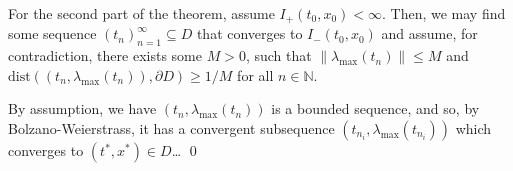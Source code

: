 \documentclass[
]{article}
\theoremstyle{definition}
\theoremstyle{definition}
\begin{document}
For the second part of the theorem, assume \(I_+(t_0, x_0) < \infty\).
Then, we may find some sequence \((t_n)_{n = 1}^\infty\subseteq D\) that
converges to \(I_-(t_0, x_0)\) and assume, for contradiction, there
exists some \(M > 0\), such that \(\|\lambda_{\max}(t_n)\| \le M\) and
\(\text{dist}((t_n, \lambda_{\max}(t_n)),  \partial D) \ge 1 / M\) for
all \(n \in \mathbb{N}\).

By assumption, we have \((t_n, \lambda_{\max}(t_n))\) is a bounded
sequence, and so, by Bolzano-Weierstrass, it has a convergent
subsequence \((t_{n_i}, \lambda_{\max}(t_{n_i}))\) which converges to
\((t^*, x^*) \in D\)\ldots{} \qed
\end{document}
